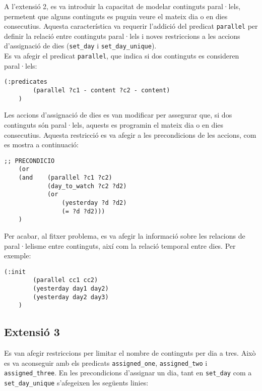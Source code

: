 \documentclass[a4paper]{article}
\begin{document}
	A l'extensió 2, es va introduir la capacitat de modelar continguts paral·lels, permetent que alguns continguts es puguin veure el mateix dia o en dies consecutius. Aquesta característica va requerir l'addició del predicat \texttt{parallel} per definir la relació entre continguts paral·lels i noves restriccions a les accions d'assignació de dies (\texttt{set\_day} i \texttt{set\_day\_unique}).\\
	
	Es va afegir el predicat \texttt{parallel}, que indica si dos continguts es consideren paral·lels:
	\begin{lstlisting}[language=PDDL, caption={Definició del predicat \texttt{parallel}}, label={lst:predicatParallel}]
	(:predicates
		(parallel ?c1 - content ?c2 - content)
	)
	\end{lstlisting}
	
	Les accions d'assignació de dies es van modificar per assegurar que, si dos continguts són paral·lels, aquests es programin el mateix dia o en dies consecutius. Aquesta restricció es va afegir a les precondicions de les accions, com es mostra a continuació:
	
	\begin{lstlisting}[language=PDDL, caption={Restriccions per continguts paral·lels}, label={lst:extensio2}]
	;; PRECONDICIO
	(or
	(and 	(parallel ?c1 ?c2)
		 	(day_to_watch ?c2 ?d2)
		 	(or
				(yesterday ?d ?d2)
				(= ?d ?d2)))
	)
	\end{lstlisting}
	
	Per acabar, al fitxer problema, es va afegir la informació sobre les relacions de paral·lelisme entre continguts, així com la relació temporal entre dies. Per exemple:
	\begin{lstlisting}[language=PDDL, caption={Inicialització de paral·lels i dies consecutius}, label={lst:iniExtensio2}]
	(:init
		(parallel cc1 cc2)
		(yesterday day1 day2)
		(yesterday day2 day3)
	)
	\end{lstlisting}
	

	
	\subsection{Extensió 3}
	Es van afegir restriccions per limitar el nombre de continguts per dia a tres. Això es va aconseguir amb els predicats \texttt{assigned\_one}, \texttt{assigned\_two} i \texttt{assigned\_three}. En les precondicions d'assignar un dia, tant en \texttt{set\_day} com a \texttt{set\_day\_unique} s'afegeixen les següents linies: \\
	
\end{document}
